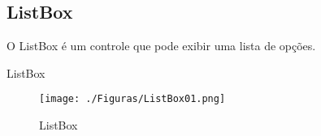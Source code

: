 

		\subsection{ListBox}


	\begin{frame}

		O ListBox é um controle que pode exibir uma lista de opções.

		
		\begin{CaixaModelo01}{ListBox}
			
			\begin{figure}\textbf{}
				\texttt{[image: ./Figuras/ListBox01.png]}
				\caption{ListBox}
				\label{fig:ListBox01}
			\end{figure}			

		\end{CaixaModelo01}
	
	\end{frame}


